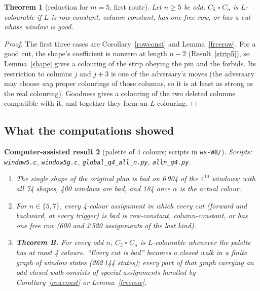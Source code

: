 \documentclass[11pt]{article}
\theoremstyle{plain}
\newtheorem{theorem}{Theorem}[section]
\newtheorem{computed}[theorem]{Computer-assisted result}
\theoremstyle{definition}
\theoremstyle{remark}
\newcommand{\T}{\mathbin{\square}}
\newcommand{\script}[1]{\texttt{#1}}
\begin{document}
\begin{theorem}[reduction for $m = 5$, first route]\label{red5}
Let $n \ge 5$ be odd. $C_5 \T C_n$ is $L$-colourable if $L$ is row-constant, column-constant, has one free row, or has a cut
whose window is good.
\end{theorem}

\begin{proof}
The first three cases are Corollary~\ref{rowconst} and Lemma~\ref{freerow}. For a good cut, the shape's coefficient is
nonzero at length $n - 2$ (Result~\ref{strip5}), so Lemma~\ref{shape} gives a colouring of the strip obeying the pin and the
forbids. Its restriction to columns $j$ and $j+3$ is one of the adversary's moves (the adversary may choose \emph{any}
proper colourings of those columns, so it is at least as strong as the real colouring). Goodness gives a colouring of the
two deleted columns compatible with it, and together they form an $L$-colouring.
\end{proof}

\subsection{What the computations showed}

\begin{computed}[palette of 4 colours; scripts in \script{ws-W8/}]\label{thmB}
Scripts: \script{window5.c}, \script{window5g.c}, \script{global\_q4\_all\_n.py}, \script{alln\_q4.py}.
\begin{enumerate}[label=(\alph*),nosep]
\item The single shape of the original plan is bad on 6\,904 of the $4^{10}$ windows; with all 74 shapes, 400 windows are
bad, and 184 once $\alpha$ is the actual colour.
\item For $n \in \{5, 7\}$, every 4-colour assignment in which every cut (forward and backward, at every trigger) is bad is
row-constant, column-constant, or has one free row (600 and 2\,520 assignments of the last kind).
\item \textbf{Theorem B.} For every odd $n$, $C_5 \T C_n$ is $L$-colourable whenever the palette has at most 4 colours.
``Every cut is bad'' becomes a closed walk in a finite graph of window states (262\,144 states); every part of that
graph carrying an odd closed walk consists of special assignments handled by Corollary~\ref{rowconst} or
Lemma~\ref{freerow}.
\end{enumerate}
\end{computed}
\end{document}
